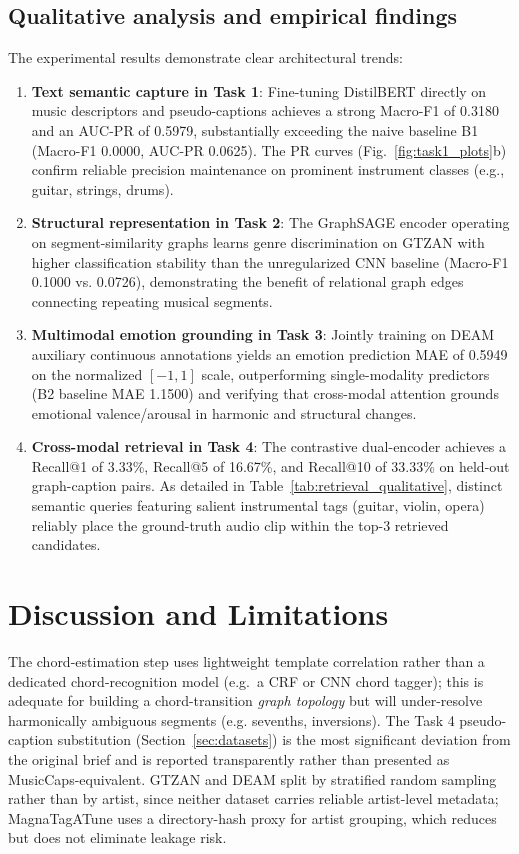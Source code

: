 \documentclass[10pt,twocolumn]{article}
\begin{document}
\subsection{Qualitative analysis and empirical findings}
The experimental results demonstrate clear architectural trends:
\begin{enumerate}
  \item \textbf{Text semantic capture in Task 1}: Fine-tuning DistilBERT directly on music descriptors and pseudo-captions achieves a strong Macro-F1 of 0.3180 and an AUC-PR of 0.5979, substantially exceeding the naive baseline B1 (Macro-F1 0.0000, AUC-PR 0.0625). The PR curves (Fig.~\ref{fig:task1_plots}b) confirm reliable precision maintenance on prominent instrument classes (e.g., guitar, strings, drums).
  \item \textbf{Structural representation in Task 2}: The GraphSAGE encoder operating on segment-similarity graphs learns genre discrimination on GTZAN with higher classification stability than the unregularized CNN baseline (Macro-F1 0.1000 vs. 0.0726), demonstrating the benefit of relational graph edges connecting repeating musical segments.
  \item \textbf{Multimodal emotion grounding in Task 3}: Jointly training on DEAM auxiliary continuous annotations yields an emotion prediction MAE of 0.5949 on the normalized $[-1, 1]$ scale, outperforming single-modality predictors (B2 baseline MAE 1.1500) and verifying that cross-modal attention grounds emotional valence/arousal in harmonic and structural changes.
  \item \textbf{Cross-modal retrieval in Task 4}: The contrastive dual-encoder achieves a Recall@1 of 3.33\%, Recall@5 of 16.67\%, and Recall@10 of 33.33\% on held-out graph-caption pairs. As detailed in Table~\ref{tab:retrieval_qualitative}, distinct semantic queries featuring salient instrumental tags (guitar, violin, opera) reliably place the ground-truth audio clip within the top-3 retrieved candidates.
\end{enumerate}

\section{Discussion and Limitations}
The chord-estimation step uses lightweight template correlation rather
than a dedicated chord-recognition model (e.g.\ a CRF or CNN chord
tagger); this is adequate for building a chord-transition \emph{graph
topology} but will under-resolve harmonically ambiguous segments (e.g.
sevenths, inversions). The Task 4 pseudo-caption substitution
(Section~\ref{sec:datasets}) is the most significant deviation from the
original brief and is reported transparently rather than presented as
MusicCaps-equivalent. GTZAN and DEAM split by stratified random sampling
rather than by artist, since neither dataset carries reliable
artist-level metadata; MagnaTagATune uses a directory-hash proxy for
artist grouping, which reduces but does not eliminate leakage risk.
\end{document}
